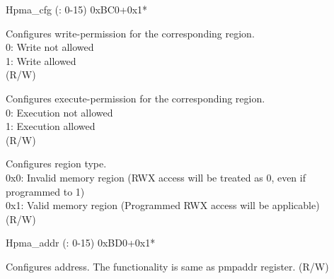 \addtocounter{Regfloat}{-1}
\begin{register}{H}{pma\_cfg (: 0-15)} {0xBC0+0x1*}
\begin{regdesc}\begin{reglist}
\item [Continued from the previous page...]
\label{fielddesc:WRITE}\item [WRITE] Configures write-permission for the corresponding region.\\
0: Write not allowed\\
1: Write allowed\\
 (R/W)
\label{fielddesc:EXECUTE}\item [EXECUTE] Configures execute-permission for the corresponding region.\\
0: Execution not allowed\\
1: Execution allowed\\
 (R/W)
\label{fielddesc:TYPE}\item [TYPE] Configures region type. \\
0x0: Invalid memory region (RWX access will be treated as 0, even if programmed to 1)\\
0x1: Valid memory region (Programmed RWX access will be applicable)\\
(R/W)
\end{reglist}
\end{regdesc}
\end{register}

\begin{register}{H}{pma\_addr (: 0-15)} {0xBD0+0x1*}
\label{regdesc:pma_addrX}
%
\regnewline%
\begin{regdesc}
\begin{reglist}
\label{fielddesc:PMAADDR}\item [ADDR] Configures address. The functionality is same as pmpaddr register. (R/W)
\end{reglist}
\end{regdesc}
\end{register}
